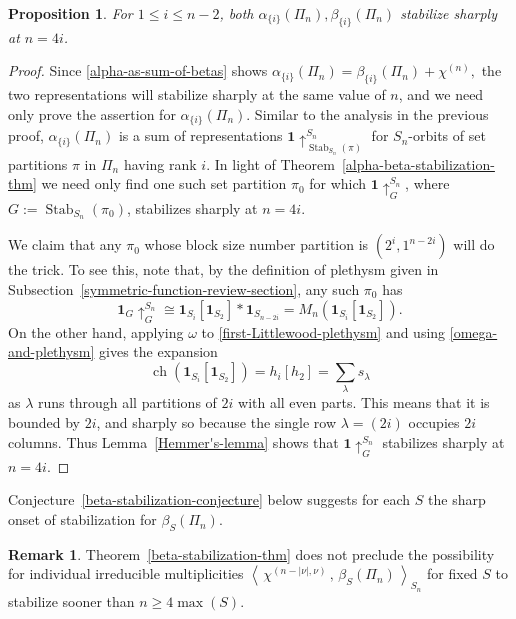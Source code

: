 \documentclass[12pt]{amsart}
\theoremstyle{plain}
\newtheorem{prop}[thm]{Proposition}
\theoremstyle{definition}
\newtheorem{rk}[thm]{Remark}
\begin{document}
\begin{prop}
\label{worst-beta-stabilization-thm}
For $1 \leq i \leq n-2$,
both $\alpha_{\{i\}}(\Pi_n), \beta_{\{i\}}(\Pi_n)$ 
stabilize sharply at $n =4i$.
\end{prop}

\begin{proof}
Since \eqref{alpha-as-sum-of-betas} shows
$
\alpha_{\{i\}}(\Pi_n)
  =\beta_{\{i\}}(\Pi_n)+ \chi^{(n)},
$
the two representations will stabilize sharply
at the same value of $n$, and we need only
prove the assertion for $\alpha_{\{i\}}(\Pi_n)$.  
Similar to the analysis in the previous proof,
$\alpha_{\{i\}}(\Pi_n)$ is a sum of 
representations 
${{\mathbf{1}}} \uparrow_{{{\operatorname{Stab}}}_{S_n}(\pi)}^{S_n}$ 
for $S_n$-orbits of set 
partitions $\pi$ in $\Pi_n$ having rank $i$.
In light of Theorem~\ref{alpha-beta-stabilization-thm} we need 
only find one such set partition $\pi_0$ for which 
${{\mathbf{1}}} \uparrow_{G}^{S_n}$,
where $G:={{\operatorname{Stab}}}_{S_n}(\pi_0)$, stabilizes sharply at $n=4i$.

We claim that any $\pi_0$ whose block size number partition
is $(2^i,1^{n-2i})$ will do the trick.  To see this, note
that, by the definition of plethysm given in 
Subsection~\ref{symmetric-function-review-section}, any such $\pi_0$ has
$$
{{\mathbf{1}}}_{G} \uparrow_{G}^{S_n}
 \cong  {{\mathbf{1}}}_{S_i}[{{\mathbf{1}}}_{S_2}] * {{\mathbf{1}}}_{S_{n-2i}} 
   = M_n( {{\mathbf{1}}}_{S_i}[{{\mathbf{1}}}_{S_2}] ). 
$$
On the other hand, applying $\omega$ to \eqref{first-Littlewood-plethysm}
and using \eqref{omega-and-plethysm} gives the expansion
$$
{{\operatorname{ch}}}({{\mathbf{1}}}_{S_i}[{{\mathbf{1}}}_{S_2}])=h_i[h_2]=\sum_\lambda s_{\lambda}
$$
as $\lambda$ runs through all partitions of $2i$ with all even parts.
This means that it is bounded by $2i$, and sharply so because
the single row $\lambda=(2i)$ occupies $2i$ columns.
Thus Lemma~\ref{Hemmer's-lemma} shows 
that ${{\mathbf{1}}} \uparrow_{G}^{S_n}$ stabilizes sharply at $n=4i$.
\end{proof}

Conjecture~\ref{beta-stabilization-conjecture} below 
suggests for each $S$ the sharp onset of stabilization for $\beta_S(\Pi_n)$.

\begin{rk}
Theorem~\ref{beta-stabilization-thm} does not preclude
the possibility for individual irreducible multiplicities
$
\left\langle \, \chi^{(n-|\nu|,\nu)} \, , \, \beta_S(\Pi_n) \, \right\rangle_{S_n}
$
for fixed $S$ to stabilize sooner than $n \geq 4\max(S)$.
\end{rk}
\end{document}
